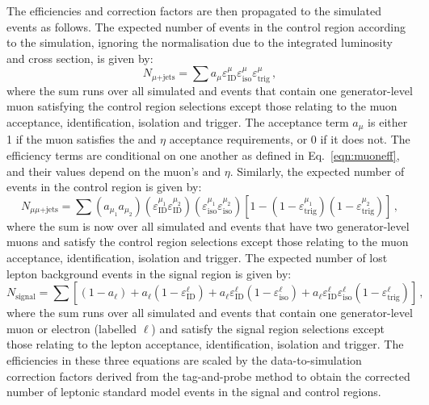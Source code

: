 The efficiencies and correction factors are then propagated to the simulated 
events as follows. The expected number of events in the \mj control region 
according to the simulation, ignoring the normalisation due to the integrated 
luminosity and cross section, is given by:
\begin{equation}
N_{\mu\mathrm{+jets}} = \sum a_\mu \varepsilon_\mathrm{ID}^\mu 
\varepsilon_\mathrm{iso}^\mu \varepsilon_\mathrm{trig}^\mu \, ,
\end{equation}
where the sum runs over all simulated \wlj and \ttbar events that contain one 
generator-level muon satisfying the \mj control region 
selections except those relating to the muon acceptance, identification, 
isolation and 
trigger. The acceptance term $a_\mu$ is either 1 if the muon satisfies the 
\pt and $\eta$ acceptance requirements, or 0 if it does not. The efficiency 
terms are conditional on one another as 
defined in Eq.~\ref{eqn:muoneff}, and their values depend on the muon's \pt and 
$\eta$. Similarly, the expected number of events in the \mmj control region is 
given by:
\begin{equation}
N_{\mu\mu\mathrm{+jets}} = \sum (a_{\mu_1} a_{\mu_2}) 
(\varepsilon_\mathrm{ID}^{\mu_1} \varepsilon_\mathrm{ID}^{\mu_2}) 
(\varepsilon_\mathrm{iso}^{\mu_1} \varepsilon_\mathrm{iso}^{\mu_2}) 
[1 - (1-\varepsilon_\mathrm{trig}^{\mu_1}) 
(1-\varepsilon_\mathrm{trig}^{\mu_2})] \, ,
\end{equation}
where the sum is now over all simulated \zmmj and \ttbar events that have two 
generator-level muons and satisfy the \mmj control region 
selections except those relating to the muon acceptance, identification, 
isolation and 
trigger. The expected number of lost lepton background events in the signal 
region is given by:
\begin{equation}
N_{\mathrm{signal}} = \sum \left[ (1-a_\ell) + a_\ell (1- 
\varepsilon_\mathrm{ID}^\ell) + a_\ell \varepsilon_\mathrm{ID}^\ell 
(1-\varepsilon_\mathrm{iso}^\ell) + a_\ell \varepsilon_\mathrm{ID}^\ell 
\varepsilon_\mathrm{iso}^\ell (1-\varepsilon_\mathrm{trig}^\ell) \right] \, ,
\end{equation}
where the sum runs over all simulated \wlj and \ttbar events that contain one 
generator-level muon or electron (labelled $\ell$) and satisfy the signal 
region selections 
except those relating to the lepton acceptance, identification, isolation and 
trigger. The 
efficiencies in these three equations are scaled by the data-to-simulation 
correction factors derived from the tag-and-probe method to obtain the 
corrected number of leptonic standard model events in the signal and control 
regions. 

